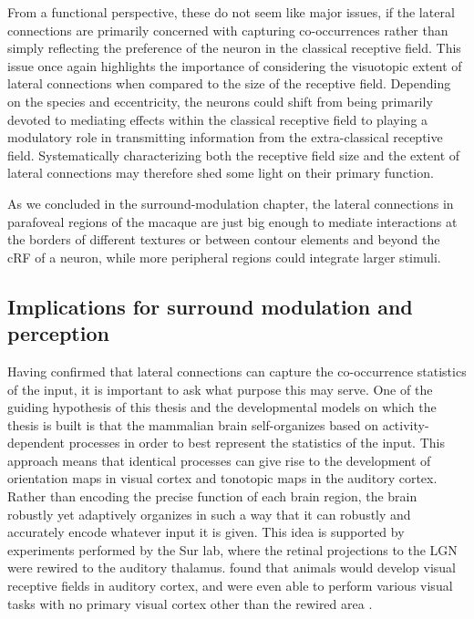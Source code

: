 From a functional perspective, these do not seem like major issues, if
the lateral connections are primarily concerned with capturing
co-occurrences rather than simply reflecting the preference of the
neuron in the classical receptive field. This issue once again
highlights the importance of considering the visuotopic extent of
lateral connections when compared to the size of the receptive
field. Depending on the species and eccentricity, the neurons could
shift from being primarily devoted to mediating effects within the
classical receptive field to playing a modulatory role in transmitting
information from the extra-classical receptive field. Systematically
characterizing both the receptive field size and the extent of lateral
connections may therefore shed some light on their primary function.

As we concluded in the surround-modulation chapter, the lateral
connections in parafoveal regions of the macaque are just big enough
to mediate interactions at the borders of different textures or
between contour elements and beyond the cRF of a neuron, while more
peripheral regions could integrate larger stimuli.

\subsection{Implications for surround modulation and perception}

Having confirmed that lateral connections can capture the
co-occurrence statistics of the input, it is important to ask what
purpose this may serve. One of the guiding hypothesis of this thesis
and the developmental models on which the thesis is built is that the
mammalian brain self-organizes based on activity-dependent processes
in order to best represent the statistics of the input. This approach
means that identical processes can give rise to the development of
orientation maps in visual cortex and tonotopic maps in the auditory
cortex. Rather than encoding the precise function of each brain
region, the brain robustly yet adaptively organizes in such a way that
it can robustly and accurately encode whatever input it is given. This
idea is supported by experiments performed by the Sur lab, where the
retinal projections to the LGN were rewired to the auditory thalamus.
\cite{Sur1990} found that animals would develop visual receptive
fields in auditory cortex, and were even able to perform various
visual tasks with no primary visual cortex other than the rewired area
\citep{vonMelchner2000}.

